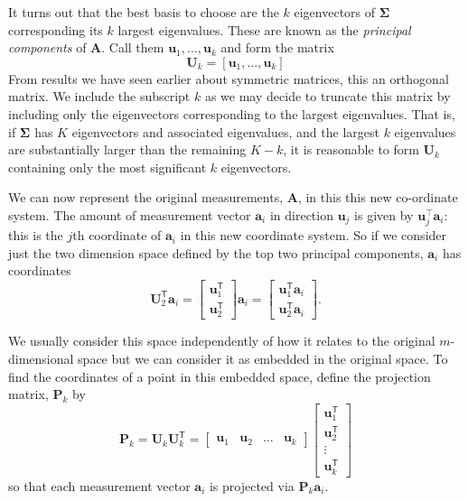 It turns out that the best basis to choose are the $k$ eigenvectors of $\mathbf \Sigma$  corresponding its $k$ largest eigenvalues.  These are known as the {\em principal components} of $\mathbf A$.  Call them $\mathbf u_1, \ldots, \mathbf u_k$ and form the matrix 
\[
\mathbf U_k = [\mathbf u_1, \ldots, \mathbf u_k]
\]
From results we have seen earlier about symmetric matrices, this an orthogonal matrix.  We include the subscript $k$ as we may decide to truncate this matrix by including only the eigenvectors corresponding to the largest eigenvalues.  That is, if $\mathbf \Sigma$ has $K$ eigenvectors and associated eigenvalues, and the largest $k$ eigenvalues are substantially larger than the remaining $K-k$, it is reasonable to form $ \mathbf U_k$ containing only the most significant $k$ eigenvectors.



We can now represent  the original measurements, $\mathbf A$, in this this new co-ordinate system.   The amount of measurement vector $\mathbf a_i$ in direction $\mathbf u_j$ is given by $\mathbf u_j^\top  \mathbf a_i$:  this is the  $j$th coordinate of $\mathbf a_i$ in this new coordinate system.  So if we consider just the two dimension space defined by the top two principal components,  $\mathbf a_i$ has coordinates  \[ \mathbf{U}_2^\mathsf{T} \mathbf a_i  = 
\left[\begin{array}{c}
\mathbf{u}_1^\mathsf{T}\\ \mathbf{u}_2^\mathsf{T} 
\end{array}\right] \mathbf a_i 
= 
\left[\begin{array}{c}
\mathbf{u}_1^\mathsf{T}\mathbf a_i \\ \mathbf{u}_2^\mathsf{T} \mathbf a_i
\end{array}\right]. \]

We usually consider this space independently of how it relates to the original $m$-dimensional space but we can consider it as embedded in the original  space.
To find the coordinates of a point in this embedded space, define the projection matrix, $\mathbf P_k$  by
\[
\mathbf{P}_k = \mathbf{U}_k\mathbf{U}_k^\mathsf{T} = 
\left[\begin{array}{cccc}
\mathbf{u}_1 & \mathbf{u}_2 & \ldots & \mathbf{u}_k
\end{array}\right]
\left[\begin{array}{c}
\mathbf{u}_1^\mathsf{T}\\ \mathbf{u}_2^\mathsf{T}\\ \vdots \\ \mathbf{u}_k^\mathsf{T}
\end{array}\right]
\]
so that each measurement vector $\mathbf a_i$ is projected via $\mathbf P_k \mathbf a_i$.  

